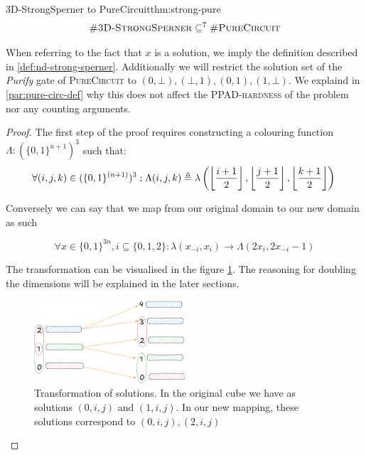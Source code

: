 \begin{theorembox}{3D-StrongSperner to PureCircuit}{thm:strong-pure}
    $$
    \textnormal{\textsc{\#3D-StrongSperner}} \subseteq^{7} \textnormal{\textsc{\#PureCircuit}}
    $$
\end{theorembox}

When referring to the fact that $x$ is a solution, we imply the definition described in  \ref{def:nd-strong-sperner}.
Additionally we will restrict the solution set of the \textit{Purify} gate of \textsc{PureCircuit}
to $(0,\bot),(\bot, 1), (0,1), (1, \bot)$.  We explaind in \ref{par:pure-circ-def} why this
does not affect the \textsc{PPAD-hardness} of the problem nor any counting arguments.

\begin{proof} 
    The first step of the proof requires constructing a colouring function $\Lambda: (\{0,1\}^{n+1})^3$ such that:
$$
    \forall (i,j,k) \in (\{0,1\}^{(n+1)})^3: \Lambda(i,j,k) \triangleq 
\lambda\left( \left\lfloor  \frac{{i+1}}{2}  \right\rfloor, \left\lfloor  \frac{{j+1}}{2} \right\rfloor, \left\lfloor  \frac{{k+1}}{2} \right\rfloor \right)  \\
$$

Conversely we can say that we map from our original domain to our new domain as such

\begin{equation}
    \label{eq:trans-eq}
\forall  x \in \{ 0,1 \}^{3n}, i \subseteq \{ 0,1,2 \}: \lambda(x_{-i}, x_{i}) \to \Lambda(2x_{i}, 2x_{-i} -1)
\end{equation}

The transformation can be visualised in the figure \ref{fig:main-proof:set_mapping}.
The reasoning for doubling the dimensions will be explained in the later sections.

\begin{figure}[h!]
    \centering
    \includegraphics[width=0.5\textwidth]{assets/1751381227.png}
\caption{Transformation of solutions. In the original cube we have as solutions $(0, i,j)$ and $(1, i,j)$. In our new mapping, these solutions correspond to
$(0, i,j), (2,i,j)$}
    \label{fig:main-proof:set_mapping}
\end{figure}


\end{proof}
